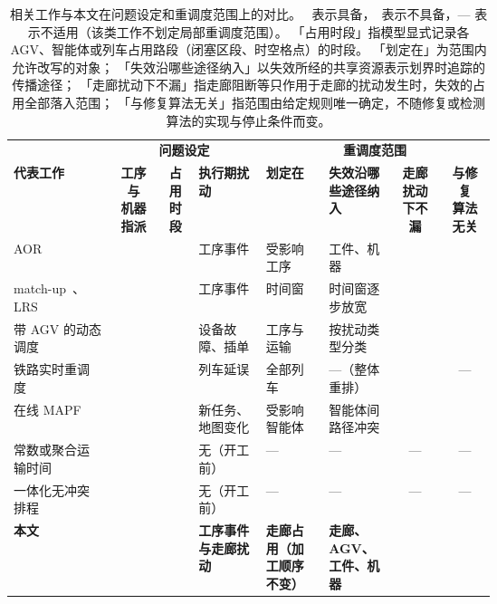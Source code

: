 \documentclass[manuscript,screen,review]{acmart}
\newcommand{\cmark}{\ding{51}}
\newcommand{\xmark}{\ding{55}}
\begin{document}
\begin{table}[t]
\centering
\caption{相关工作与本文在问题设定和重调度范围上的对比。
\cmark\ 表示具备，\xmark\ 表示不具备，— 表示不适用（该类工作不划定局部重调度范围）。
「占用时段」指模型显式记录各 AGV、智能体或列车占用路段（闭塞区段、时空格点）的时段。
「划定在」为范围内允许改写的对象；
「失效沿哪些途径纳入」以失效所经的共享资源表示划界时追踪的传播途径；
「走廊扰动下不漏」指走廊阻断等只作用于走廊的扰动发生时，失效的占用全部落入范围；
「与修复算法无关」指范围由给定规则唯一确定，不随修复或检测算法的实现与停止条件而变。}
\label{tab:position}
\small
\setlength{\tabcolsep}{3pt}
\begin{tabular}{@{}p{0.21\linewidth}ccp{0.14\linewidth}p{0.13\linewidth}p{0.14\linewidth}cc@{}}
\toprule
& \multicolumn{3}{c}{\textbf{问题设定}} & \multicolumn{4}{c}{\textbf{重调度范围}} \\
\cmidrule(lr){2-4}\cmidrule(l){5-8}
\textbf{代表工作} &
\makecell{\textbf{工序与}\\\textbf{机器指派}} &
\makecell{\textbf{占用}\\\textbf{时段}} &
\textbf{执行期扰动} &
\textbf{划定在} &
\textbf{失效沿哪些途径纳入} &
\makecell{\textbf{走廊扰动}\\\textbf{下不漏}} &
\makecell{\textbf{与修复}\\\textbf{算法无关}} \\
\midrule
AOR~\cite{subramaniam2003maor} &
\cmark & \xmark & 工序事件 & 受影响工序 & 工件、机器 & \xmark & \cmark \\
match-up~\cite{qiao2012single,salido2017rescheduling}、LRS~\cite{kuster2007local} &
\cmark & \xmark & 工序事件 & 时间窗 & 时间窗逐步放宽 & \xmark & \xmark \\
带 AGV 的动态调度~\cite{zhang2023energy,tang2026dynamic} &
\cmark & \xmark & 设备故障、插单 & 工序与运输 & 按扰动类型分类 & \xmark & \cmark \\
铁路实时重调度~\cite{mascis2002alternative,dariano2007branch} &
\xmark & \cmark & 列车延误 & 全部列车 & —（整体重排） & \cmark & — \\
在线 MAPF~\cite{svancara2019online,malka2024online} &
\xmark & \cmark & 新任务、地图变化 & 受影响智能体 & 智能体间路径冲突 & \cmark & \xmark \\
常数或聚合运输时间~\cite{meng2025cp,qin2026knowledge,jafarian2026integrated} &
\cmark & \xmark & 无（开工前） & — & — & — & — \\
一体化无冲突排程~\cite{vanos2026exact,sun2023integrated,li2026framework} &
\cmark & \cmark & 无（开工前） & — & — & — & — \\
\midrule
\textbf{本文} &
\cmark & \cmark & \textbf{工序事件与走廊扰动} & \textbf{走廊占用（加工顺序不变）} & \textbf{走廊、AGV、工件、机器} & \cmark & \cmark \\
\bottomrule
\end{tabular}
\end{table}
\end{document}
